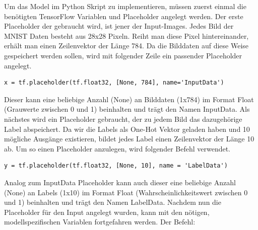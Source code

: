 Um das Model im Python Skript zu implementieren, müssen zuerst einmal die benötigten TensorFlow Variablen und Placeholder angelegt werden.
Der erste Placeholder der gebraucht wird, ist jener der Input-Images. Jedes Bild der MNIST Daten besteht aus 28x28 Pixeln. Reiht man diese Pixel hintereinander, erhält man einen Zeilenvektor der Länge 784. Da die Bilddaten auf diese Weise gespeichert werden sollen, wird mit folgender Zeile ein passender Placeholder angelegt.

\lstset{language=Python}

\begin{lstlisting}
x = tf.placeholder(tf.float32, [None, 784], name='InputData')
\end{lstlisting}



Dieser kann eine beliebige Anzahl (None) an Bilddaten (1x784) im Format Float (Grauwerte zwischen 0 und 1) beinhalten und trägt den Namen InputData. Als nächstes wird ein Placeholder gebraucht, der zu jedem Bild das dazugehörige Label abspeichert. Da wir die Labels als One-Hot Vektor geladen haben und 10 mögliche Ausgänge existieren, bildet jedes Label einen Zeilenvektor der Länge 10 ab. Um so einen Placeholder anzulegen, wird folgender Befehl verwendet.

\lstset{language=Python}

\begin{lstlisting}
y = tf.placeholder(tf.float32, [None, 10], name = 'LabelData')
\end{lstlisting}

Analog zum InputData Placeholder kann auch dieser eine beliebige Anzahl (None) an Labels (1x10) im Format Float (Wahrscheinlichkeitswert zwischen 0 und 1) beinhalten und trägt den Namen LabelData.
Nachdem nun die Placeholder für den Input angelegt wurden, kann mit den nötigen, modellspezifischen Variablen fortgefahren werden. 
Der Befehl: 


